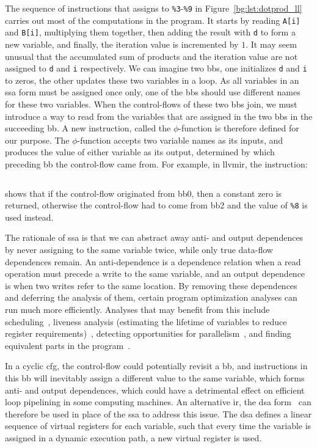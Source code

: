 The sequence of instructions that assigns to \verb|%3|-\verb|%9| in
Figure~\ref{bg:lst:dotprod_ll} carries out most of the computations in the
program.  It starts by reading \verb|A[i]| and \verb|B[i]|, multiplying them
together, then adding the result with \verb|d| to form a new variable, and
finally, the iteration value is incremented by $1$.  It may seem unusual that
the accumulated sum of products and the iteration value are not assigned
to \verb|d| and \verb|i| respectively.  We can imagine two \glspl{bb}, one
initializes \verb|d| and \verb|i| to zeros, the other updates these two
variables in a loop.  As all variables in an \gls{ssa} form must be assigned
once only, one of the \glspl{bb} should use different names for these two
variables.  When the control-flows of these two \glspl{bb} join, we must
introduce a way to read from the variables that are assigned in the two
\glspl{bb} in the succeeding \gls{bb}\@.  A new instruction, called the
$\phi$-function is therefore defined for our purpose.  The $\phi$-function
accepts two variable names as its inputs, and produces the value of either
variable as its output, determined by which preceding \gls{bb} the control-flow
came from.  For example, in \gls{llvmir}, the instruction:
\begin{lstlisting}[language=LLVM]
    %d.01 = phi float [ 0.000000e+00, %0 ], [ %8, %2 ]
\end{lstlisting}\vspace{-10pt}
shows that if the control-flow originated from \gls{bb}0, then a constant zero
is returned, otherwise the control-flow had to come from \gls{bb}2 and the
value of \verb|%8| is used instead.

The rationale of \gls{ssa} is that we can abstract away anti- and output
dependences by never assigning to the same variable twice, while only true
data-flow dependences remain.  An anti-dependence is a dependence relation
when a read operation must precede a write to the same variable, and an output
dependence is when two writes refer to the same location.  By removing these
dependences and deferring the analysis of them, certain program optimization
analyses can run much more efficiently.  Analyses that may benefit from this
include scheduling~\cite{rau94}, liveness analysis (estimating the lifetime
of variables to reduce register requirements)~\cite{cytron91}, detecting
opportunities for parallelism~\cite{cytron87}, and finding equivalent parts in
the program~\cite{alpern88}.

In a cyclic \gls{cfg}, the control-flow could potentially revisit a \gls{bb},
and instructions in this \gls{bb} will inevitably assign a different value to
the same variable, which forms anti- and output dependences, which could have
a detrimental effect on efficient loop pipelining in some computing machines.
An alternative \gls{ir}, the \gls{dsa} form~\cite{rau92} can therefore be used
in place of the \gls{ssa} to address this issue.  The \gls{dsa} defines a
linear sequence of virtual registers for each variable, such that every time
the variable is assigned in a dynamic execution path, a new virtual register is
used.

